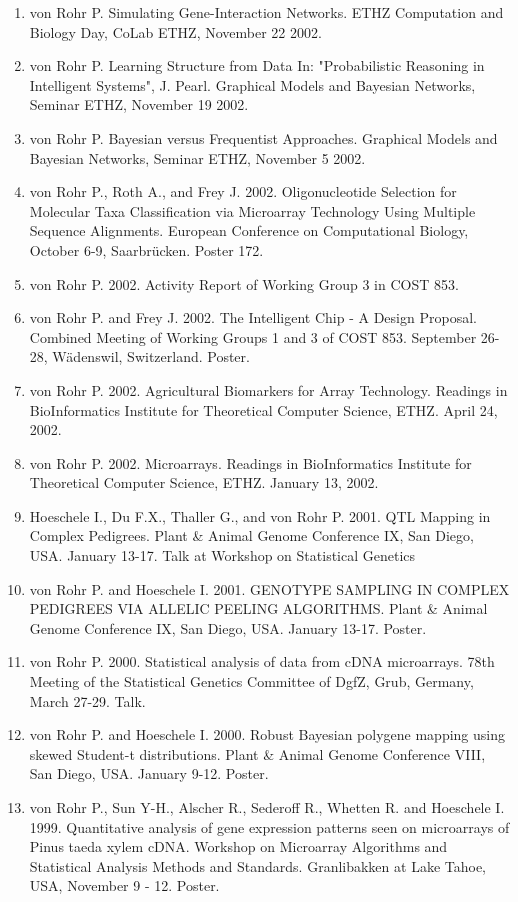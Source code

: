 \documentclass[11pt,a4paper]{scrartcl}
\begin{document}
\begin{enumerate}
\item von Rohr P. Simulating Gene-Interaction Networks. ETHZ Computation and Biology Day, CoLab ETHZ, November 22 2002.
\item von Rohr P. Learning Structure from Data In: "Probabilistic Reasoning in Intelligent Systems", J. Pearl. Graphical Models and Bayesian Networks, Seminar ETHZ, November 19 2002. 
\item von Rohr P. Bayesian versus Frequentist Approaches. Graphical Models and Bayesian Networks, Seminar ETHZ, November 5 2002.
\item von Rohr P., Roth A., and Frey J. 2002. Oligonucleotide Selection for Molecular Taxa Classification via Microarray Technology Using Multiple Sequence Alignments. European Conference on Computational Biology, October 6-9, Saarbr\"ucken. Poster 172.
\item von Rohr P. 2002. Activity Report of Working Group 3 in COST 853.
\item von Rohr P. and Frey J. 2002. The Intelligent Chip - A Design Proposal. Combined Meeting of Working Groups 1 and 3 of COST 853. September 26-28, W\"adenswil, Switzerland. Poster.
\item von Rohr P. 2002. Agricultural Biomarkers for Array Technology. Readings in BioInformatics Institute for Theoretical Computer Science, ETHZ. April 24, 2002.
\item von Rohr P. 2002. Microarrays. Readings in BioInformatics Institute for Theoretical Computer Science, ETHZ. January 13, 2002.
\item Hoeschele I., Du F.X., Thaller G., and von Rohr P. 2001. QTL Mapping in Complex Pedigrees. Plant \& Animal Genome Conference IX, San Diego, USA. January 13-17. Talk at Workshop on Statistical Genetics 
\item von Rohr P. and Hoeschele I. 2001. GENOTYPE  SAMPLING IN COMPLEX PEDIGREES VIA ALLELIC PEELING ALGORITHMS. Plant \& Animal Genome Conference IX, San Diego, USA. January 13-17. Poster.
\item von Rohr P. 2000. Statistical analysis of data from cDNA microarrays. 78th Meeting of the Statistical Genetics Committee of DgfZ, Grub, Germany, March 27-29. Talk.
\item von Rohr P. and Hoeschele I. 2000. Robust Bayesian polygene mapping using skewed Student-t distributions. Plant \& Animal Genome Conference VIII, San Diego, USA. January 9-12. Poster.
\item von Rohr P., Sun Y-H., Alscher R., Sederoff R., Whetten R. and Hoeschele I. 1999. Quantitative analysis of gene expression patterns seen on microarrays of Pinus taeda xylem cDNA. Workshop on Microarray Algorithms and Statistical Analysis Methods and Standards. Granlibakken at Lake Tahoe, USA, November 9 - 12. Poster. 

\end{enumerate}
\end{document}
